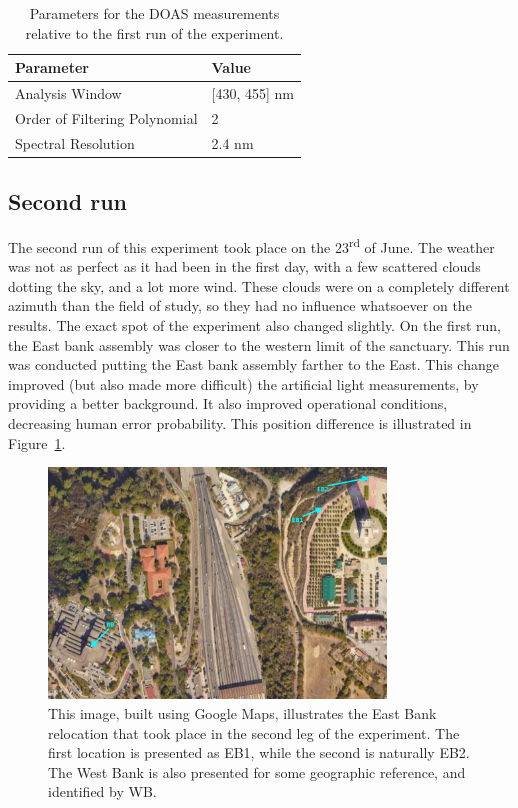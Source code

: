 \begin{table}[htpb]
    \centering
    \caption{Parameters for the DOAS measurements relative to the first
    run of the experiment.}
    \label{tab:doas_parameters_exp1}
    \begin{tabular}{@{}ll@{}}
        \toprule
        \textbf{Parameter}                   & \textbf{Value}    \\
        \midrule
        Analysis Window                      & {[}430, 455{]} nm \\
        \midrule
        Order of Filtering Polynomial        & 2                 \\
        \midrule
        Spectral Resolution                  & 2.4 nm           \\
        \bottomrule
    \end{tabular}
\end{table}

\subsection{Second run}%
\label{sub:second_run}

The second run of this experiment took place on the
23\textsuperscript{rd} of June. The weather was not as perfect as it had
been in the first day, with a few scattered clouds dotting the sky, and
a lot more wind. These clouds were on a completely different azimuth
than the field of study, so they had no influence whatsoever on the
results. The exact spot of the experiment also changed slightly. On the
first run, the East bank assembly was closer to the western limit of the
sanctuary. This run was conducted putting the East bank assembly farther
to the East. This change improved (but also made more difficult) the
artificial light measurements, by providing a better background. It also
improved operational conditions, decreasing human error probability.
This position difference is illustrated in
Figure~\ref{fig:changing_position}.

\begin{figure}[htpb]
    \centering
    \includegraphics[width=0.8\textwidth]{img/png/eastbank_changed.png}
    \caption{This image, built using Google Maps, illustrates the East
    Bank relocation that took place in the second leg of the experiment.
    The first location is presented as EB1, while the second is naturally
    EB2. The West Bank is also presented for some geographic reference, and
    identified by WB.}
    \label{fig:changing_position}
\end{figure}

